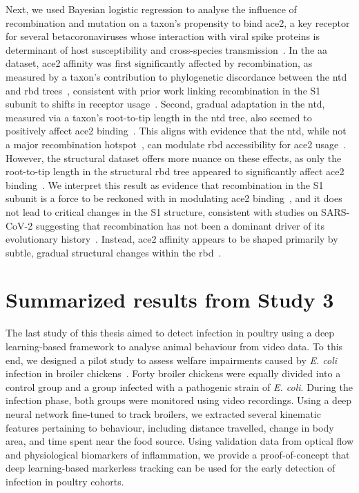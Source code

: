 Next, we used Bayesian logistic regression to analyse the influence of recombination and mutation on a taxon's propensity to bind \gls{ace2}, a key receptor for several betacoronaviruses whose interaction with viral spike proteins is determinant of host susceptibility and cross-species transmission~\cite{li2016, hoffmann2020, starr2022}. In the \gls{aa} dataset, \gls{ace2} affinity was first significantly affected by recombination, as measured by a taxon's contribution to phylogenetic discordance between the \gls{ntd} and \gls{rbd} trees~\cite{scheidwasser2025a}, consistent with prior work linking recombination in the S1 subunit to shifts in receptor usage~\cite{li2020, jackson2022, temmam2022}. Second, gradual adaptation in the \gls{ntd}, measured via a taxon's root-to-tip length in the \gls{ntd} tree, also seemed to positively affect \gls{ace2} binding~\cite{scheidwasser2025a}. This aligns with evidence that the \gls{ntd}, while not a major recombination hotspot~\cite{deklerk2022}, can modulate \gls{rbd} accessibility for \gls{ace2} usage~\cite{meng2022}. However, the structural dataset offers more nuance on these effects, as only the root-to-tip length in the structural \gls{rbd} tree appeared to significantly affect \gls{ace2} binding~\cite{scheidwasser2025a}. We interpret this result as evidence that recombination in the S1 subunit is a force to be reckoned with in modulating \gls{ace2} binding~\cite{li2020, deklerk2022}, and it does not lead to critical changes in the S1 structure, consistent with studies on SARS-CoV-2 suggesting that recombination has not been a dominant driver of its evolutionary history~\cite{boni2020, wells2023}. Instead, \gls{ace2} affinity appears to be shaped primarily by subtle, gradual structural changes within the \gls{rbd}~\cite{wrobel2021}.

\section{Summarized results from Study 3}
The last study of this thesis aimed to detect infection in poultry using a deep learning-based framework to analyse animal behaviour from video data. To this end, we designed a pilot study to assess welfare impairments caused by \textit{E. coli} infection in broiler chickens~\cite{scheidwasser2025c}. Forty broiler chickens were equally divided into a control group and a group infected with a pathogenic strain of \textit{E. coli}. During the infection phase, both groups were monitored using video recordings. Using a deep neural network fine-tuned to track broilers, we extracted several kinematic features pertaining to behaviour, including distance travelled, change in body area, and time spent near the food source. Using validation data from optical flow and physiological biomarkers of inflammation, we provide a proof-of-concept that deep learning-based markerless tracking can be used for the early detection of infection in poultry cohorts. %


